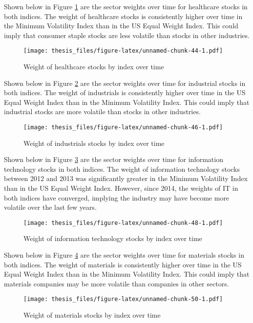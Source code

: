 \documentclass[12pt,twoside]{reedthesis}
\theoremstyle{definition}
\theoremstyle{definition}
\theoremstyle{definition}
\theoremstyle{remark}
\begin{document}
Shown below in Figure \ref{fig:sector5} are the sector weights over time
for healthcare stocks in both indices. The weight of healthcare stocks
is consistently higher over time in the Minimum Volatility Index than in
the US Equal Weight Index. This could imply that consumer staple stocks
are less volatile than stocks in other industries.
\begin{figure}[htbp]
\centering
\texttt{[image: thesis\_files/figure-latex/unnamed-chunk-44-1.pdf]}
\caption{\label{fig:unnamed-chunk-44}Weight of healthcare stocks by index
over time\label{fig:sector5}}
\end{figure}
\clearpage
Shown below in Figure \ref{fig:sector6} are the sector weights over time
for industrial stocks in both indices. The weight of industrials is
consistently higher over time in the US Equal Weight Index than in the
Minimum Volatility Index. This could imply that industrial stocks are
more volatile than stocks in other industries.
\begin{figure}[htbp]
\centering
\texttt{[image: thesis\_files/figure-latex/unnamed-chunk-46-1.pdf]}
\caption{\label{fig:unnamed-chunk-46}Weight of industrials stocks by index
over time\label{fig:sector6}}
\end{figure}
Shown below in Figure \ref{fig:sector7} are the sector weights over time
for information technology stocks in both indices. The weight of
information technology stocks between 2012 and 2013 was significantly
greater in the Minimum Volatility Index than in the US Equal Weight
Index. However, since 2014, the weights of IT in both indices have
converged, implying the industry may have become more volatile over the
last few years.
\begin{figure}[htbp]
\centering
\texttt{[image: thesis\_files/figure-latex/unnamed-chunk-48-1.pdf]}
\caption{\label{fig:unnamed-chunk-48}Weight of information technology stocks
by index over time\label{fig:sector7}}
\end{figure}
\clearpage
Shown below in Figure \ref{fig:sector8} are the sector weights over time
for materials stocks in both indices. The weight of materials is
consistently higher over time in the US Equal Weight Index than in the
Minimum Volatility Index. This could imply that materials companies may
be more volatile than companies in other sectors.
\begin{figure}[htbp]
\centering
\texttt{[image: thesis\_files/figure-latex/unnamed-chunk-50-1.pdf]}
\caption{\label{fig:unnamed-chunk-50}Weight of materials stocks by index
over time\label{fig:sector8}}
\end{figure}
\end{document}
